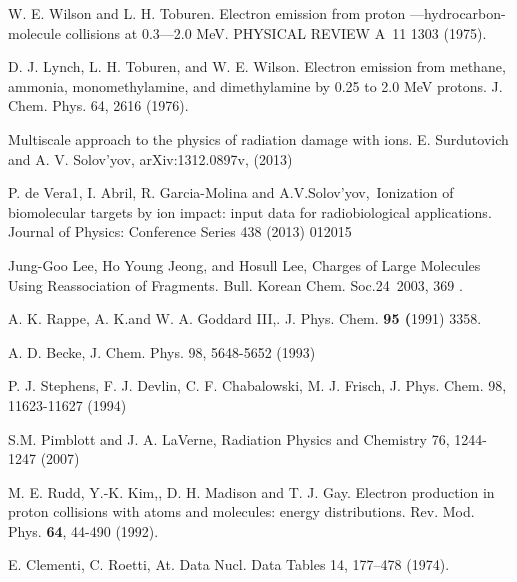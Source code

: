 \documentclass[preprint,12pt]{article}
\begin{document}
\begin{thebibliography}{99}
W. E. Wilson and L. H. Toburen. Electron emission from
proton ---hydrocarbon-molecule collisions at 0.3---2.0 MeV. PHYSICAL REVIEW
A\ 11 1303 (1975).

D. J. Lynch, L. H. Toburen, and W. E. Wilson. Electron
emission from methane, ammonia, monomethylamine, and dimethylamine by 0.25
to 2.0 MeV protons. J. Chem. Phys. 64, 2616 (1976).

Multiscale approach to the physics of radiation
damage with ions. E. Surdutovich and A. V. Solov'yov, arXiv:1312.0897v,
(2013)

P. de Vera1, I. Abril, R. Garcia-Molina and
A.V.Solov'yov,\ Ionization of biomolecular targets by ion impact: input data
for radiobiological applications. Journal of Physics: Conference Series 438
(2013) 012015

Jung-Goo Lee, Ho Young Jeong, and Hosull Lee, Charges of
Large Molecules Using Reassociation of Fragments. Bull. Korean Chem. Soc.24\
2003, 369 .

A. K. Rappe, A. K.and W. A. Goddard III,. J. Phys. Chem. 
\textbf{95 (}1991) 3358.

A. D. Becke, 
J. Chem. Phys. 98, 5648-5652 (1993) 

P. J. Stephens, F. J. Devlin, C. F. Chabalowski, M. J. Frisch,
J. Phys. Chem. 98, 11623-11627 (1994) 

S.M. Pimblott and J. A. LaVerne, Radiation
Physics and Chemistry 76, 1244-1247 (2007)

M. E. Rudd, Y.-K. Kim,, D. H. Madison and T. J. Gay.
Electron production in proton collisions with atoms and molecules: energy
distributions. Rev. Mod. Phys. \textbf{64}, 44-490 (1992).

E. Clementi, C. Roetti,
At. Data Nucl. Data Tables 14, 177--478 (1974).


\end{thebibliography}
\end{document}
